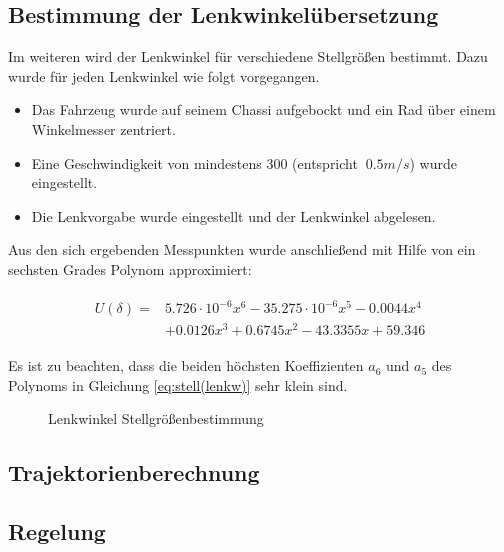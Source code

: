 \subsection*{Bestimmung der Lenkwinkelübersetzung}
Im weiteren wird der Lenkwinkel für verschiedene Stellgrößen bestimmt. Dazu wurde für jeden Lenkwinkel wie folgt vorgegangen.

\begin{itemize}
\item Das Fahrzeug wurde auf seinem Chassi aufgebockt und ein Rad über einem Winkelmesser zentriert.
\item Eine Geschwindigkeit von mindestens 300 (entspricht $~0.5m/s$) wurde eingestellt.
\item Die Lenkvorgabe wurde eingestellt und der Lenkwinkel abgelesen.
\end{itemize}

Aus den sich ergebenden Messpunkten wurde anschließend mit Hilfe von \MATLAB ein sechsten Grades Polynom approximiert:

\begin{align}
\begin{split}
\label{eq:stell(lenkw)}
U(\delta) =&5.726\cdot10^{-6}x^6-35.275\cdot10^{-6}x^5 -0.0044x^4\\ 
&+0.0126x^3+0.6745x^2-43.3355x+59.346
\end{split}
\end{align}

Es ist zu beachten, dass die beiden höchsten Koeffizienten $a_6$ und $a_5$ des Polynoms in Gleichung \ref{eq:stell(lenkw)} sehr klein sind.
	
\begin{figure}[h]
\centering

\caption{Lenkwinkel Stellgrößenbestimmung}
\label{fig:lenkgroesse} 
\end{figure}
	
\subsection{Trajektorienberechnung}\label{sec:traj}
\subsection{Regelung}\label{sec:ctrl}